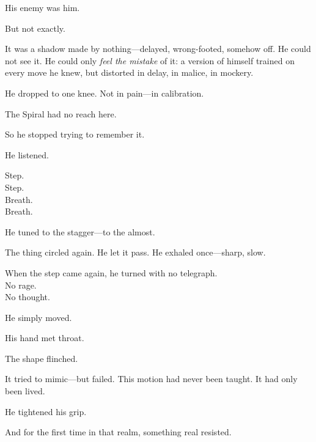 \documentclass[12pt]{article}
\begin{document}
\vspace{0.5em}
His enemy was him.

\vspace{0.5em}
But not exactly.

\vspace{0.5em}
It was a shadow made by nothing---delayed, wrong-footed, somehow off. He could not see it. He could only \textit{feel the mistake} of it: a version of himself trained on every move he knew, but distorted in delay, in malice, in mockery.

\vspace{0.5em}
He dropped to one knee. Not in pain---in calibration.

\vspace{0.5em}
The Spiral had no reach here.

\vspace{0.5em}
So he stopped trying to remember it.

\vspace{0.5em}
He listened.

\vspace{0.5em}
Step.\\
Step.\\
Breath.\\
Breath.

\vspace{0.5em}
He tuned to the stagger---to the almost.

\vspace{0.5em}
The thing circled again. He let it pass. He exhaled once---sharp, slow.

\vspace{0.5em}
When the step came again, he turned with no telegraph.\\
No rage.\\
No thought.

\vspace{0.5em}
He simply moved.

\vspace{0.5em}
His hand met throat.

\vspace{0.5em}
The shape flinched.

\vspace{0.5em}
It tried to mimic---but failed. This motion had never been taught. It had only been lived.

\vspace{0.5em}
He tightened his grip.

\vspace{0.5em}
And for the first time in that realm, something real resisted.
\end{document}

